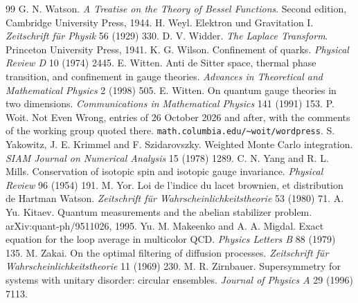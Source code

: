 \begin{thebibliography}{99}
 G. N. Watson. \emph{A Treatise on the Theory of Bessel Functions}. Second edition, Cambridge University Press, 1944.
 H. Weyl. Elektron und Gravitation I. \emph{Zeitschrift f\"ur Physik} 56 (1929) 330.
 D. V. Widder. \emph{The Laplace Transform}. Princeton University Press, 1941.
 K. G. Wilson. Confinement of quarks. \emph{Physical Review D} 10 (1974) 2445.
 E. Witten. Anti de Sitter space, thermal phase transition, and confinement in gauge theories. \emph{Advances in Theoretical and Mathematical Physics} 2 (1998) 505.
 E. Witten. On quantum gauge theories in two dimensions. \emph{Communications in Mathematical Physics} 141 (1991) 153.
 P. Woit. Not Even Wrong, entries of 26 October 2026 and after, with the comments of the working group quoted there. \texttt{math.columbia.edu/\~{}woit/wordpress}.
 S. Yakowitz, J. E. Krimmel and F. Szidarovszky. Weighted Monte Carlo integration. \emph{SIAM Journal on Numerical Analysis} 15 (1978) 1289.
 C. N. Yang and R. L. Mills. Conservation of isotopic spin and isotopic gauge invariance. \emph{Physical Review} 96 (1954) 191.
 M. Yor. Loi de l'indice du lacet brownien, et distribution de Hartman Watson. \emph{Zeitschrift f\"ur Wahrscheinlichkeitstheorie} 53 (1980) 71.
 A. Yu. Kitaev. Quantum measurements and the abelian stabilizer problem. arXiv:quant-ph/9511026, 1995.
 Yu. M. Makeenko and A. A. Migdal. Exact equation for the loop average in multicolor QCD. \emph{Physics Letters B} 88 (1979) 135.
 M. Zakai. On the optimal filtering of diffusion processes. \emph{Zeitschrift f\"ur Wahrscheinlichkeitstheorie} 11 (1969) 230.
 M. R. Zirnbauer. Supersymmetry for systems with unitary disorder: circular ensembles. \emph{Journal of Physics A} 29 (1996) 7113.
\end{thebibliography}

